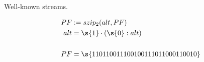 \begin{example}{Well-known streams.}
\begin{itemize}
		\begin{align*}
			PF &:= szip_2(alt,PF) \\
			alt &= \s{1} \cdot (\s{0} : alt) \\\\
			PF &= \s{110110011100100111011000110010}
		\end{align*}
	\end{itemize}
\end{example}